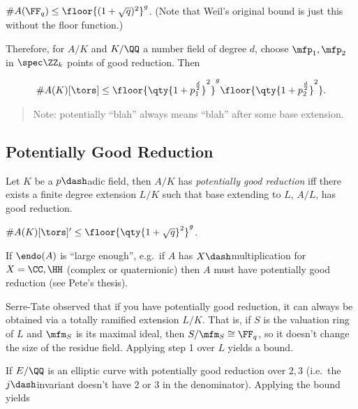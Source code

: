 \begin{description}
\tightlist
\item[Theorem (Weil, Serre. Improved Weil Bounds)]
\(\# A(\FF_q) \leq \floor{ (1 + \sqrt q)^2}^g\). (Note that Weil's
original bound is just this without the floor function.)
\end{description}

Therefore, for \(A/K\) and \(K/\QQ\) a number field of degree \(d\),
choose \(\mfp_1, \mfp_2\) in \(\spec \ZZ_k\) points of good reduction.
Then

\begin{align*}
\# A(K)[\tors] \leq \floor{ \qty{1+p_1^{\frac d 2}   }^2  }^g
\floor{ \qty{ 1 + p_2^{\frac d 2}  }^2  }
.\end{align*}

\begin{quote}
Note: potentially ``blah'' always means ``blah'' after some base
extension.
\end{quote}

\hypertarget{potentially-good-reduction}{%
\subsection{Potentially Good
Reduction}\label{potentially-good-reduction}}

\begin{description}
\tightlist
\item[Definition (Potentially Good Reduction)]
Let \(K\) be a \(p\dash\)adic field, then \(A/K\) has \emph{potentially
good reduction} iff there exists a finite degree extension \(L/K\) such
that base extending to \(L\), \(A/L\), has good reduction.
\item[Proposition]
\(\# A(K)[\tors]' \leq \floor{\qty{1 + \sqrt q }^2 }^g\).
\item[Remark]
If \(\endo(A)\) is ``large enough'', e.g.~if \(A\) has
\(X\dash\)multiplication for \(X = \CC, \HH\) (complex or quaternionic)
then \(A\) must have potentially good reduction (see Pete's thesis).
\item[Proof]
Serre-Tate observed that if you have potentially good reduction, it can
always be obtained via a totally ramified extension \(L/K\). That is, if
\(S\) is the valuation ring of \(L\) and \(\mfm_S\) is its maximal
ideal, then \(S/\mfm_S \cong \FF_q\), so it doesn't change the size of
the residue field. Applying step 1 over \(L\) yields a bound.
\item[Application]
If \(E/\QQ\) is an elliptic curve with potentially good reduction over
\(2, 3\) (i.e.~the \(j\dash\)invariant doesn't have 2 or 3 in the
denominator). Applying the bound yields
\end{description}

